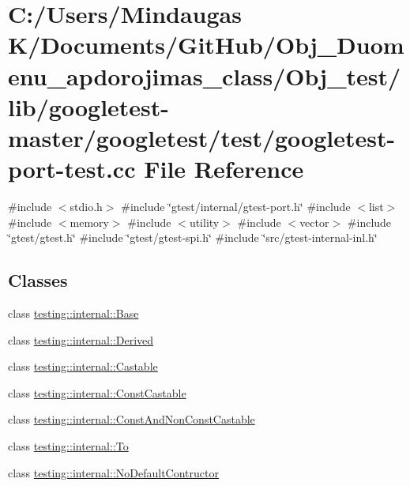 \hypertarget{_obj__test_2lib_2googletest-master_2googletest_2test_2googletest-port-test_8cc}{}\section{C\+:/\+Users/\+Mindaugas K/\+Documents/\+Git\+Hub/\+Obj\+\_\+\+Duomenu\+\_\+apdorojimas\+\_\+class/\+Obj\+\_\+test/lib/googletest-\/master/googletest/test/googletest-\/port-\/test.cc File Reference}
\label{_obj__test_2lib_2googletest-master_2googletest_2test_2googletest-port-test_8cc}
{\ttfamily \#include $<$stdio.\+h$>$}\newline
{\ttfamily \#include \char`\"{}gtest/internal/gtest-\/port.\+h\char`\"{}}\newline
{\ttfamily \#include $<$list$>$}\newline
{\ttfamily \#include $<$memory$>$}\newline
{\ttfamily \#include $<$utility$>$}\newline
{\ttfamily \#include $<$vector$>$}\newline
{\ttfamily \#include \char`\"{}gtest/gtest.\+h\char`\"{}}\newline
{\ttfamily \#include \char`\"{}gtest/gtest-\/spi.\+h\char`\"{}}\newline
{\ttfamily \#include \char`\"{}src/gtest-\/internal-\/inl.\+h\char`\"{}}\newline
\subsection*{Classes}
\begin{DoxyCompactItemize}
\item 
class \mbox{\hyperlink{classtesting_1_1internal_1_1_base}{testing\+::internal\+::\+Base}}
\item 
class \mbox{\hyperlink{classtesting_1_1internal_1_1_derived}{testing\+::internal\+::\+Derived}}
\item 
class \mbox{\hyperlink{classtesting_1_1internal_1_1_castable}{testing\+::internal\+::\+Castable}}
\item 
class \mbox{\hyperlink{classtesting_1_1internal_1_1_const_castable}{testing\+::internal\+::\+Const\+Castable}}
\item 
class \mbox{\hyperlink{classtesting_1_1internal_1_1_const_and_non_const_castable}{testing\+::internal\+::\+Const\+And\+Non\+Const\+Castable}}
\item 
class \mbox{\hyperlink{classtesting_1_1internal_1_1_to}{testing\+::internal\+::\+To}}
\item 
class \mbox{\hyperlink{classtesting_1_1internal_1_1_no_default_contructor}{testing\+::internal\+::\+No\+Default\+Contructor}}
\end{DoxyCompactItemize}

